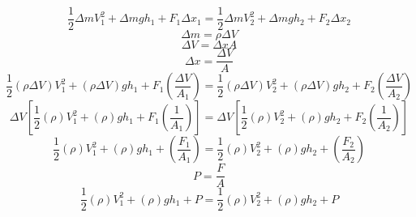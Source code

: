 \documentclass[12pt, letterpaper]{apa7}
\begin{document}
	\[ 	\dfrac{1}{2}\Delta m V_{1}^2+\Delta m g h_{1} + F_{1} \Delta x_{1} = \dfrac{1}{2}\Delta m V_{2}^2+\Delta m g h_{2} + F_{2} \Delta x_{2} \]
	\[ 	\Delta m = \rho \Delta V \]
	\[ 	\Delta V = \Delta x A \]
	\[ 	\Delta x = \dfrac{\Delta V}{A} \]
	\[ 	\dfrac{1}{2}(\rho \Delta V) V_{1}^2+(\rho \Delta V) g h_{1} + F_{1} (\dfrac{\Delta V}{A_{1}}) = \dfrac{1}{2}(\rho \Delta V) V_{2}^2+(\rho \Delta V) g h_{2} + F_{2} (\dfrac{\Delta V}{A_{2}}) \]
	\[ 	\Delta V [\dfrac{1}{2}(\rho) V_{1}^2+(\rho) g h_{1} + F_{1} (\dfrac{1}{A_{1}})] = \Delta V [\dfrac{1}{2}(\rho ) V_{2}^2+(\rho) g h_{2} + F_{2} (\dfrac{1}{A_{2}})] \]
	\[\dfrac{1}{2}(\rho) V_{1}^2+(\rho) g h_{1} + (\dfrac{ F_{1}}{A_{1}}) = \dfrac{1}{2}(\rho ) V_{2}^2+(\rho) g h_{2} +  (\dfrac{F_{2}}{A_{2}}) \]
	\[ P=\dfrac{F}{A} \]
	\[\dfrac{1}{2}(\rho) V_{1}^2+(\rho) g h_{1} + P = \dfrac{1}{2}(\rho ) V_{2}^2+(\rho) g h_{2} +  P \]
\end{document}
